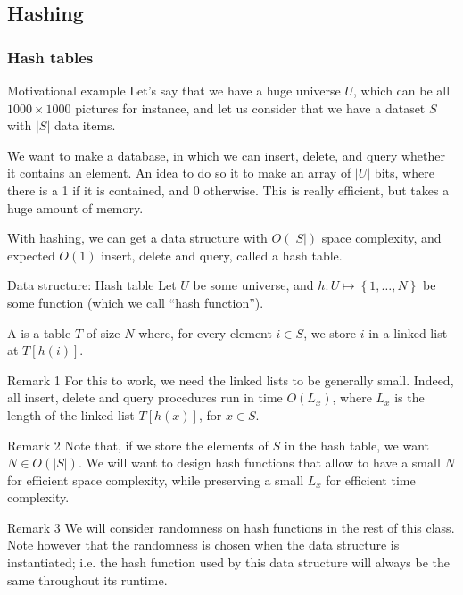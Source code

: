 \documentclass[a4paper]{article}
\begin{document}
\subsection{Hashing}
\subsubsection{Hash tables}

\begin{parag}{Motivational example}
    Let's say that we have a huge universe $U$, which can be all $1000 \times 1000$ pictures for instance, and let us consider that we have a dataset $S$ with $\left|S\right|$ data items. 

    We want to make a database, in which we can insert, delete, and query whether it contains an element. An idea to do so it to make an array of $\left|U\right|$ bits, where there is a 1 if it is contained, and 0 otherwise. This is really efficient, but takes a huge amount of memory. 

    With hashing, we can get a data structure with $O\left(\left|S\right|\right)$ space complexity, and expected $O\left(1\right)$ insert, delete and query, called a hash table.
\end{parag}

\begin{parag}{Data structure: Hash table}
    Let $U$ be some universe, and $h: U \mapsto \left\{1, \ldots, N\right\}$ be some function (which we call ``hash function'').

    A  is a table $T$ of size $N$ where, for every element $i \in S$, we store $i$ in a linked list at $T\left[h\left(i\right)\right]$.

    \begin{subparag}{Remark 1}
         For this to work, we need the linked lists to be generally small. Indeed, all insert, delete and query procedures run in time $O\left(L_x\right)$, where $L_x$ is the length of the linked list $T\left[h\left(x\right)\right]$, for $x \in S$.
    \end{subparag}

    \begin{subparag}{Remark 2}
        Note that, if we store the elements of $S$ in the hash table, we want $N \in O\left(\left|S\right|\right)$. We will want to design hash functions that allow to have a small $N$ for efficient space complexity, while preserving a small $L_x$ for efficient time complexity.
    \end{subparag}

    \begin{subparag}{Remark 3}
        We will consider randomness on hash functions in the rest of this class. Note however that the randomness is chosen when the data structure is instantiated; i.e. the hash function used by this data structure will always be the same throughout its runtime.
    \end{subparag}
\end{parag}
\end{document}
